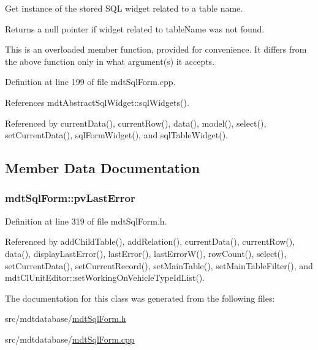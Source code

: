 Get instance of the stored S\-Q\-L widget related to a table name. 

Returns a null pointer if widget related to table\-Name was not found.

This is an overloaded member function, provided for convenience. It differs from the above function only in what argument(s) it accepts. 

Definition at line 199 of file mdt\-Sql\-Form.\-cpp.



References mdt\-Abstract\-Sql\-Widget\-::sql\-Widgets().



Referenced by current\-Data(), current\-Row(), data(), model(), select(), set\-Current\-Data(), sql\-Form\-Widget(), and sql\-Table\-Widget().



\subsection{Member Data Documentation}
\hypertarget{classmdt_sql_form_afc24e8dedd1249a29708347fdff560fd}{
\subsubsection[{pv\-Last\-Error}]{ mdt\-Sql\-Form\-::pv\-Last\-Error\hspace{0.3cm}{\ttfamily [protected]}}}\label{classmdt_sql_form_afc24e8dedd1249a29708347fdff560fd}


Definition at line 319 of file mdt\-Sql\-Form.\-h.



Referenced by add\-Child\-Table(), add\-Relation(), current\-Data(), current\-Row(), data(), display\-Last\-Error(), last\-Error(), last\-Error\-W(), row\-Count(), select(), set\-Current\-Data(), set\-Current\-Record(), set\-Main\-Table(), set\-Main\-Table\-Filter(), and mdt\-Cl\-Unit\-Editor\-::set\-Working\-On\-Vehicle\-Type\-Id\-List().



The documentation for this class was generated from the following files\-:\begin{DoxyCompactItemize}
\item 
src/mdtdatabase/\hyperlink{mdt_sql_form_8h}{mdt\-Sql\-Form.\-h}\item 
src/mdtdatabase/\hyperlink{mdt_sql_form_8cpp}{mdt\-Sql\-Form.\-cpp}\end{DoxyCompactItemize}

